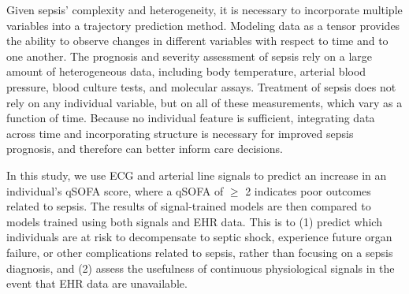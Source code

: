 Given sepsis' complexity and heterogeneity, it is necessary to incorporate multiple variables into a trajectory prediction method. Modeling data as a tensor provides the ability to observe changes in different variables with respect to time and to one another. The prognosis and severity assessment of sepsis rely on a large amount of heterogeneous data, including body temperature, arterial blood pressure, blood culture tests, and molecular assays. Treatment of sepsis does not rely on any individual variable, but on all of these measurements, which vary as a function of time. Because no individual feature is sufficient, integrating data across time and incorporating structure is necessary for improved sepsis prognosis, and therefore can better inform care decisions.

In this study, we use ECG and arterial line signals to predict an increase in an individual's qSOFA score, where a qSOFA of $\geq$ 2 indicates poor outcomes related to sepsis. The results of signal-trained models are then compared to models trained using both signals and EHR data. This is to (1) predict which individuals are at risk to decompensate to septic shock, experience future organ failure, or other complications related to sepsis, rather than focusing on a sepsis diagnosis, and (2) assess the usefulness of continuous physiological signals in the event that EHR data are unavailable. 